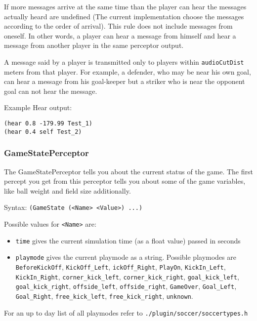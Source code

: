 If more messages arrive at the same time than the player can hear the
messages actually heard are undefined (The current implementation
choose the messages according to the order of arrival). This rule does
not include messages from oneself. In other words, a player can hear a
message from himself and hear a message from another player in the
same perceptor output.

A message said by a player is transmitted only to players within
\texttt{audioCutDist} meters from that player. For example, a
defender, who may be near his own goal, can hear a message from his
goal-keeper but a striker who is near the opponent goal can not hear
the message.

Example Hear output:
\begin{verbatim}
(hear 0.8 -179.99 Test_1)
(hear 0.4 self Test_2)
\end{verbatim}

\subsubsection{GameStatePerceptor}

The GameStatePerceptor tells you about the current status of the game.
The first percept you get from this perceptor tells you about some of
the game variables, like ball weight and field size additionally.

Syntax: \texttt{(GameState (<Name> <Value>) ...)}

Possible values for \texttt{<Name>} are:

\begin{itemize}
  
\item \texttt{time} gives the current simulation time (as a float
  value) passed in seconds
  
\item \texttt{playmode} gives the current playmode as a string.
  Possible playmodes are \texttt{BeforeKickOff},
  \texttt{KickOff\_Left}, \texttt{ickOff\_Right}, \texttt{PlayOn},
  \texttt{KickIn\_Left}, \texttt{KickIn\_Right},
  \texttt{corner\_kick\_left}, \texttt{corner\_kick\_right},
  \texttt{goal\_kick\_left}, \texttt{goal\_kick\_right},
  \texttt{offside\_left}, \texttt{offside\_right}, \texttt{GameOver},
  \texttt{Goal\_Left}, \texttt{Goal\_Right}, \texttt{free\_kick\_left},
  \texttt{free\_kick\_right}, \texttt{unknown}.
\end{itemize}

For an up to day list of all playmodes refer to
\texttt{./plugin/soccer/soccertypes.h}



